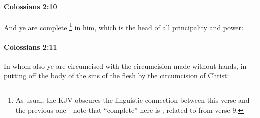 		\paragraph{Colossians 2:10} %
			\label{COLOSSIANS-2-10}

			And ye are complete%
				\footnote{%
					As usual, the KJV obscures the linguistic connection between this verse and the previous one---note that ``complete'' here is , related to  from verse 9.
					}
			in him, which is the head of all principality and power:

			\begin{framed}
			\scriptsize
				\begin{compactdesc}
					\item[SBLG]  \hyperref[PLEROO]{} \hyperref[EXOUSIA]{}\gr{,}
				\end{compactdesc}
			\end{framed}

		\paragraph{Colossians 2:11} %
			\label{COLOSSIANS-2-11}

			In whom also ye are circumcised with the circumcision made without hands, in putting off the body of the sins of the flesh by the circumcision of Christ:


